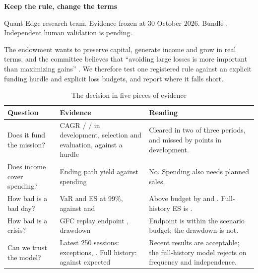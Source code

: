 \documentclass[11pt,a4paper]{article}
\begin{document}
\thispagestyle{fancy}
\par\vspace{2pt}
{\sffamily\bfseries\huge\color{qeink} Keep the rule, change the terms\par}\vspace{3pt}
{\sffamily\small\color{qemuted} Quant Edge research team. Evidence frozen at 30 October 2026. Bundle \qeBundle. Independent human validation is pending.\par}

The endowment wants to preserve capital, generate income and grow in real terms, and the committee believes that ``avoiding large losses is more important than maximizing gains'' \citep{quantedge2026}. We therefore test one registered rule against an explicit funding hurdle and explicit loss budgets, and report where it falls short.

\begin{table}[h]\centering\caption{The decision in five pieces of evidence}\label{tab:evidence}\small
\begin{tabular}{@{}p{}p{}p{}@{}}
\toprule
Question & Evidence & Reading \\
\midrule
Does it fund the mission? & CAGR \qeDevCagr{} / \qeSelCagr{} / \qeEvalCagr{} in development, selection and evaluation, against a \qeHurdle{} hurdle & Cleared in two of three periods, and missed by \qeHurdleGapDevAbs{} points in development. \\
Does income cover spending? & Ending path yield \qeIncomeYield{} against \qeSpending{} spending & No. Spending also needs planned sales. \\
How bad is a bad day? & VaR \qeVarUsd{} and ES \qeEsUsd{} at 99\%, against \qeBudgetVarUsd{} and \qeBudgetEsUsd{} & Above budget by \qeVarExcess{} and \qeEsExcess{}. Full-history ES is \qeFullEsUsd{}. \\
How bad is a crisis? & GFC replay endpoint \qeGfcReturn{}, drawdown \qeGfcDrawdown{} & Endpoint is within the \qeBudgetScenario{} scenario budget; the drawdown is not. \\
Can we trust the model? & Latest 250 sessions: \qeBaselHs{} exceptions, \qeBaselHsZone{}. Full history: \qeHsFullExceptions{} against \qeHsFullExpected{} expected & Recent results are acceptable; the full-history model rejects on frequency and independence. \\
\bottomrule
\end{tabular}
\end{table}
\end{document}
